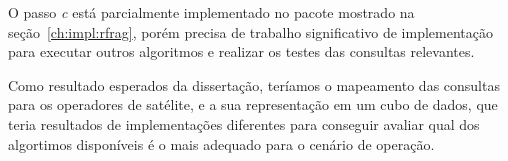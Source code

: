 O passo \textit{c} está parcialmente implementado no pacote mostrado na seção~\ref{ch:impl:rfrag}, porém precisa de trabalho significativo de implementação para executar outros algoritmos e realizar os testes das consultas relevantes.

Como resultado esperados da dissertação, teríamos o mapeamento das consultas para os operadores de satélite, e a sua representação em um cubo de dados, que teria resultados de implementações diferentes para conseguir avaliar qual dos algortimos disponíveis é o mais adequado para o cenário de operação.




